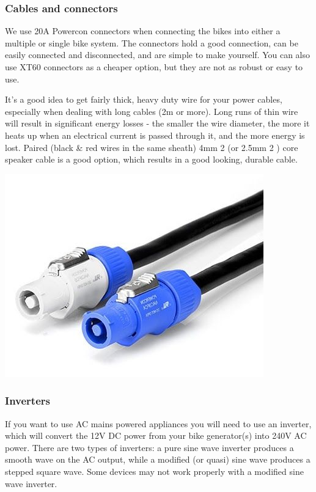 \documentclass{article}
\theoremstyle{definition}
\theoremstyle{definition}
\theoremstyle{remark}
\begin{document}
  \subsubsection*{Cables and connectors} %
  \label{ssub:cables_and_connectors}

    We use 20A Powercon connectors when connecting the bikes into either a multiple or single bike system. The connectors hold a good connection, can be easily connected and disconnected, and are simple to make yourself. You can also use XT60 connectors as a cheaper option, but they are not as robust or easy to use.

    It’s a good idea to get fairly thick, heavy duty wire for your power cables, especially when dealing with long cables (2m or more). Long runs of thin wire will result in significant energy losses - the smaller the wire diameter, the more it heats up when an electrical current is passed through it, and the more energy is lost. Paired (black \& red wires in the same sheath) 4mm 2 (or 2.5mm 2 ) core speaker cable is a good option, which results in a good looking, durable cable.
  
    \begin{center}
      \includegraphics[width=0.15\paperwidth]{../Images/image_5_2_(connectors).png}
    \end{center}


  \subsubsection*{Inverters} %
  \label{ssub:inverters}

    If you want to use AC mains powered appliances you will need to use an inverter, which will convert the 12V DC power from your bike generator(s) into 240V AC power. There are two types of inverters: a pure sine wave inverter produces a smooth wave on the AC output, while a modified (or quasi) sine wave produces a stepped square wave. Some devices may not work properly with a modified sine wave inverter.
\end{document}
